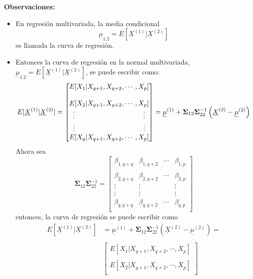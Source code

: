 \documentclass[
]{book}
\theoremstyle{definition}
\theoremstyle{definition}
\theoremstyle{definition}
\theoremstyle{definition}
\theoremstyle{remark}
\begin{document}
\textbf{Observaciones:}

\begin{itemize}
\item
  En regresión multivariada, la media condicional
  \[
  \underline{\mu}_{1.2}=E[\underline{X}^{(1)} |\underline{X}^{(2)}]
  \]
  es llamada la curva de regresión.
\item
  Entonces la curva de regresión en la normal multivariada, \(\underline{\mu}_{1.2}=E[\underline{X}^{(1)} |\underline{X}^{(2)}]\), se puede escribir como:
  \[
   E[\underline{X}^{(1)} |\underline{X}^{(2)}]=\begin{bmatrix}
  E[X_1 | X_{q+1},X_{q+2},\cdots, X_{p}]\\ \\ 
  E[X_2 | X_{q+1},X_{q+2},\cdots, X_{p}]\\ 
  \vdots  \hspace{3.5cm} \vdots    \\
  \vdots  \hspace{3.5cm} \vdots    \\
  E[X_q | X_{q+1},X_{q+2},\cdots, X_{p}]
  \end{bmatrix}=
  \underline{\mu}^{(1)}+\mathbf{\Sigma}_{12}\mathbf{\Sigma}_{22}^{-1}\left(\underline{X}^{(2)}-
  \underline{\mu}^{(2)}\right) 
  \]
  Ahora sea
  \[
  \mathbf{\Sigma}_{12}\mathbf{\Sigma}_{22}^{-1}=\begin{bmatrix}
  \beta_{1,q+q} & \beta_{1,q+2} & \cdots &\beta_{1,p}\\ \\
  \beta_{2,q+q} & \beta_{2,q+2} & \cdots &\beta_{2,p}\\
  \vdots & \vdots &  & \vdots \\
  \vdots & \vdots &  & \vdots \\
  \beta_{q,q+q} & \beta_{q,q+2} & \cdots &\beta_{q,p}\\
  \end{bmatrix}
  \]
  entonces, la curva de regresión se puede escribir como
  \begin{align*}
   E[\underline{X}^{(1)} |\underline{X}^{(2)}]&=\underline{\mu}^{(1)}+\mathbf{\Sigma}_{12}\mathbf{\Sigma}_{22}^{-1}\left(\underline{X}^{(2)}-
  \underline{\mu}^{(2)}\right)=  \\ \\
  &\begin{bmatrix}
  E[X_1 | X_{q+1},X_{q+2},\cdots, X_{p}]\\ \\ 
  E[X_2 | X_{q+1},X_{q+2},\cdots, X_{p}]\\ 

\end{bmatrix}
\end{align*}
\end{itemize}
\end{document}
